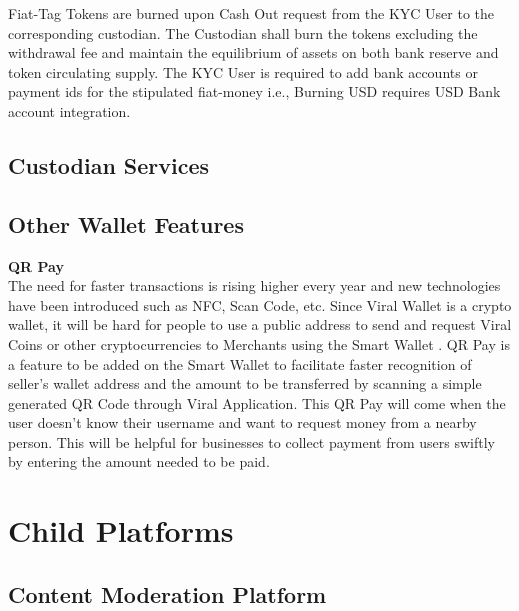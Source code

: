 \documentclass[10pt]{article}
\begin{document}
Fiat-Tag Tokens are burned upon Cash Out request from the KYC User to the corresponding custodian. The Custodian shall burn the tokens excluding the withdrawal fee and maintain the equilibrium of assets on both bank reserve and token circulating supply. The KYC User is required to add bank accounts or payment ids for the stipulated fiat-money i.e., Burning USD requires USD Bank account integration. 


\subsection{Custodian Services}

\subsection{Other Wallet Features}

\textbf{QR Pay}\\

The need for faster transactions is rising higher every year and new technologies have been introduced such as NFC, Scan Code, etc. Since Viral Wallet is a crypto wallet, it will be hard for people to use a public address to send and request Viral Coins or other cryptocurrencies to Merchants using the Smart Wallet . QR Pay is a feature to be added on the Smart Wallet to facilitate faster recognition of seller’s wallet address and the amount to be transferred by scanning a simple generated QR Code through Viral Application. This QR Pay will come when the user doesn’t know their username and want to request money from a nearby person. This will be helpful for businesses to collect payment from users swiftly by entering the amount needed to be paid.\\

\section{Child Platforms}

\subsection{Content Moderation Platform}
\end{document}
